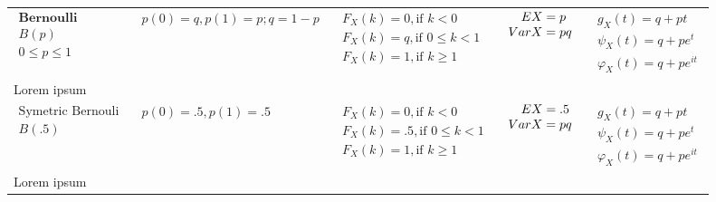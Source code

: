\documentclass{article}
\begin{document}
\begin{landscape}
\begin{table}[ht]
\begin{tabular}{@{}l p{6.5cm} p{4.5cm} p{3.0cm} r@{}}
        $\begin{array}{l}
            \textbf{Bernoulli} \\
            B(p) \\
            0 \leq p \leq 1
    \end{array}$ & 
    $\begin{array}{l}
    \displaystyle p(0) = q, p(1) = p; q = 1-p\\
    \end{array}$ & 
    $\begin{array}{l}
        \displaystyle F_X(k) = 0, \text{if } k < 0\\
        \displaystyle F_X(k) = q, \text{if } 0\leq k < 1 \\
        \displaystyle F_X(k) = 1, \text{if } k \geq 1 \\
    \end{array}$ & 
    $\begin{array}{l}
    \displaystyle \hspace{0.36cm}  EX = p \\
    \displaystyle VarX = pq
    \end{array}$ & 
    $\begin{array}{r}
    \displaystyle g_X(t) = q+pt \\
    \displaystyle \psi_X(t) = q+pe^{t} \\
    \displaystyle \varphi_X(t) = q+pe^{it}
    \end{array}$ \\
    \multicolumn{4}{p{19cm}}{Lorem ipsum} \\

    $\begin{array}{l}
        \text{Symetric Bernouli} \\
        B(.5) \\
\end{array}$ & 
$\begin{array}{l}
\displaystyle p(0) = .5, p(1) = .5
\end{array}$ & 
$\begin{array}{l}
    \displaystyle F_X(k) = 0, \text{if } k < 0\\
    \displaystyle F_X(k) = .5, \text{if } 0\leq k < 1 \\
    \displaystyle F_X(k) = 1, \text{if } k \geq 1 \\
\end{array}$ & 
$\begin{array}{l}
\displaystyle \hspace{0.36cm}  EX = .5 \\
\displaystyle VarX = pq
\end{array}$ & 
$\begin{array}{r}
\displaystyle g_X(t) = q+pt \\
\displaystyle \psi_X(t) = q+pe^{t} \\
\displaystyle \varphi_X(t) = q+pe^{it}
\end{array}$ \\
\multicolumn{4}{p{19cm}}{Lorem ipsum} \\




\end{tabular}
\end{table}
\end{landscape}
\end{document}
